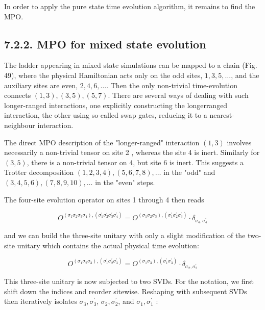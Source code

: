 \documentclass[12pt]{article}
\begin{document}
In order to apply the pure state time evolution algorithm, it remains to find the MPO.

\subsection*{7.2.2. MPO for mixed state evolution}
The ladder appearing in mixed state simulations can be mapped to a chain (Fig. 49), where the physical Hamiltonian acts only on the odd sites, $1,3,5, \ldots$, and the auxiliary sites are even, $2,4,6, \ldots$. Then the only non-trivial time-evolution connects $(1,3),(3,5),(5,7)$. There are several ways of dealing with such longer-ranged interactions, one explicitly constructing the longerranged interaction, the other using so-called swap gates, reducing it to a nearest-neighbour interaction.

The direct MPO description of the "longer-ranged" interaction $(1,3)$ involves necessarily a non-trivial tensor on site 2 , whereas the site 4 is inert. Similarly for $(3,5)$, there is a non-trivial tensor on 4, but site 6 is inert. This suggests a Trotter decomposition $(1,2,3,4),(5,6,7,8), \ldots$ in the "odd" and $(3,4,5,6),(7,8,9,10), \ldots$ in the "even" steps.

The four-site evolution operator on sites 1 through 4 then reads


\begin{equation*}
O^{\left(\sigma_{1} \sigma_{2} \sigma_{3} \sigma_{4}\right),\left(\sigma_{1}^{\prime} \sigma_{2}^{\prime} \sigma_{3}^{\prime} \sigma_{4}^{\prime}\right)}=O^{\left(\sigma_{1} \sigma_{2} \sigma_{3}\right),\left(\sigma_{1}^{\prime} \sigma_{2}^{\prime} \sigma_{3}^{\prime}\right)} \cdot \delta_{\sigma_{4}, \sigma_{4}^{\prime}} \tag{247}
\end{equation*}


and we can build the three-site unitary with only a slight modification of the two-site unitary which contains the actual physical time evolution:


\begin{equation*}
O^{\left(\sigma_{1} \sigma_{2} \sigma_{3}\right),\left(\sigma_{1}^{\prime} \sigma_{2}^{\prime} \sigma_{3}^{\prime}\right)}=O^{\left(\sigma_{1} \sigma_{3}\right),\left(\sigma_{1}^{\prime} \sigma_{3}^{\prime}\right)} \cdot \delta_{\sigma_{2}, \sigma_{2}^{\prime}} \tag{248}
\end{equation*}


This three-site unitary is now subjected to two SVDs. For the notation, we first shift down the indices and reorder sitewise. Reshaping with subsequent SVDs then iteratively isolates $\sigma_{3}, \sigma_{3}^{\prime}$, $\sigma_{2}, \sigma_{2}^{\prime}$, and $\sigma_{1}, \sigma_{1}^{\prime}$ :
\end{document}
